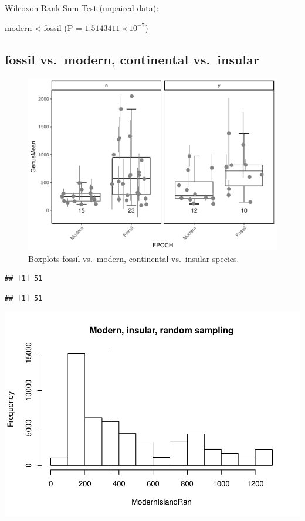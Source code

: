 \documentclass[]{article}
\begin{document}
Wilcoxon Rank Sum Test (unpaired data):

modern \textless{} fossil (P = \(1.5143411\times 10^{-7}\))

\newpage

\subsection{fossil vs.~modern, continental
vs.~insular}\label{fossil-vs.modern-continental-vs.insular}

\begin{figure}[htbp]
\centering
\includegraphics{MA_JJ_files/figure-latex/BPFMCI-1.pdf}
\caption{Boxplots fossil vs.~modern, continental vs.~insular species.}
\end{figure}

\begin{verbatim}
## [1] 51
\end{verbatim}

\begin{verbatim}
## [1] 51
\end{verbatim}

\includegraphics{MA_JJ_files/figure-latex/RSMFCI-1.pdf}
\end{document}
